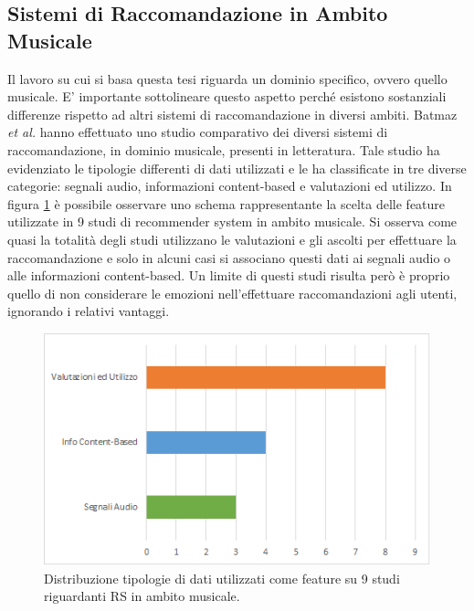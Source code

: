 \documentclass[11pt]{report}
\begin{document}
\subsection{Sistemi di Raccomandazione in Ambito Musicale}

Il lavoro su cui si basa questa tesi riguarda un dominio specifico, ovvero quello musicale. E' importante sottolineare questo aspetto perché esistono sostanziali differenze rispetto ad altri sistemi di raccomandazione in diversi ambiti.
Batmaz \textit{et al.} \cite{deep-re-sys-survey} hanno effettuato uno studio comparativo dei diversi sistemi di raccomandazione, in dominio musicale, presenti in letteratura. Tale studio ha evidenziato le tipologie differenti di dati utilizzati e le ha classificate in tre diverse categorie: segnali audio, informazioni content-based e valutazioni ed utilizzo. In figura \ref{fig:musical-RS} è possibile osservare uno schema rappresentante la scelta delle feature utilizzate in 9 studi di recommender system in ambito musicale. Si osserva come quasi la totalità degli studi utilizzano le valutazioni e gli ascolti per effettuare la raccomandazione e solo in alcuni casi si associano questi dati ai segnali audio o alle informazioni content-based. Un limite di questi studi risulta però è proprio quello di non considerare le emozioni nell'effettuare raccomandazioni agli utenti, ignorando i relativi vantaggi.

\vspace{1cm}

\begin{figure}[h!]
	 	\centering
	 	\includegraphics[scale = 0.86]{img/survery-RS.png}
	 	\caption{Distribuzione tipologie di dati utilizzati come feature su 9 studi riguardanti RS in ambito musicale.\cite{deep-re-sys-survey}}
	 	\label{fig:musical-RS}
\end{figure}
\end{document}
